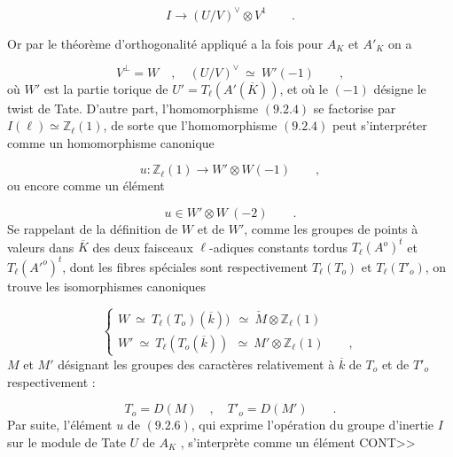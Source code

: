 \begin{equation}\tag{9.2.4}
I \longrightarrow (U/V)^{\vee} \otimes V^{1} \qquad .
\end{equation}


Or par le théorème d'orthogonalité appliqué a la fois pour $A_K$ et $A'_K$ on a

\begin{equation*}
V^{\perp} = W \quad ,\quad (U/V)^{\vee} \ \simeq\ W'(-1) \qquad ,
\end{equation*}
où $W'$ est la partie torique de $U'=T_{\ell}(A'(\overline{K}))$, et où le $(-1)$ désigne le twist de Tate. D'autre part, l'homomorphisme $(9.2.4)$ se factorise par $I(\ell) \simeq \mathbb{Z}_{\ell}(1)$, de sorte que l'homomorphisme $(9.2.4)$ peut s'interpréter comme un homomorphisme canonique

\begin{equation}\tag{9.2.5}
u: \mathbb{Z}_{\ell}(1) \longrightarrow W'\otimes W(-1) \qquad ,
\end{equation}
ou encore comme un élément

\begin{equation}\tag{9.2.6}
u \in W' \otimes W\ (-2) \qquad .
\end{equation}
Se rappelant de la définition de $W$ et de $W'$, comme les groupes de points à valeurs dans $\overline{K}$ des deux faisceaux $\ell$-adiques constants tordus $T_{\ell}(A^o)^t$ et $T_{\ell}({A'}^{o})^t$, dont les fibres spéciales sont respectivement $T_{\ell}(T_o)$ et $T_{\ell}(T'_o)$, on trouve les isomorphismes canoniques

\begin{equation}\tag{9.2.7}
\left\{ \begin{array}{l} W \ \simeq\ T_{\ell}(T_o)(\overline{k})) \ \ \simeq\ \check{M} \otimes \mathbb{Z}_{\ell}(1) \\[3ex] W' \ \simeq\ T_{\ell}(T_o(\overline{k})) \ \ \simeq\ M' \otimes \mathbb{Z}_{\ell}(1) \qquad , \end{array} \right.
\end{equation}
$M$ et $M'$ désignant les groupes des caractères relativement à $\overline{k}$ de $T_o$ et de $T'_o$ respectivement :

\begin{equation}\tag{9.2.8}
T_o = D(M) \quad ,\quad T'_o = D(M') \qquad .
\end{equation}
Par suite, l'élément $u$ de $(9.2.6)$, qui  exprime l'opération du groupe d'inertie $I$ sur le module de Tate $U$ de $A_K$ , s'interprète comme un élément CONT>>


